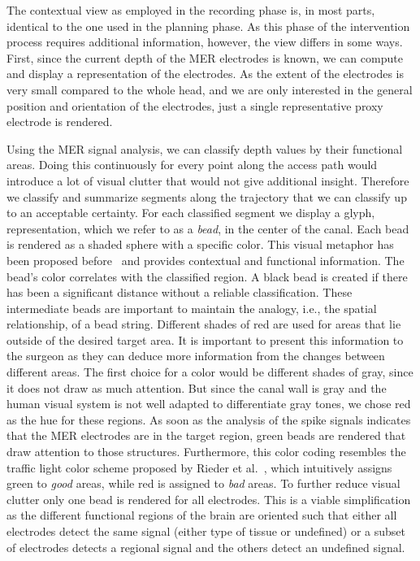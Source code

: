 \documentclass{vgtc}                          %
\begin{document}
The contextual view as employed in the recording phase is, in most parts, identical to the one used in the planning phase. As this phase of the intervention process requires additional information, however, the view differs in some ways. First, since the current depth of the MER electrodes is known, we can compute and display a representation of the electrodes. As the extent of the electrodes is very small compared to the whole head, and we are only interested in the general position and orientation of the electrodes, just a single representative proxy electrode is rendered. 

Using the MER signal analysis, we can classify depth values by their functional areas. Doing this continuously for every point along the access path would introduce a lot of visual clutter that would not give additional insight. Therefore we classify and summarize segments along the trajectory that we can classify up to an acceptable certainty. For each classified segment we display a glyph, representation, which we refer to as a \emph{bead}, in the center of the canal. Each bead is rendered as a shaded sphere with a specific color. This visual metaphor has been proposed before~\cite{Miocinovic2007,Haese2005} and provides contextual and functional information. The bead's color correlates with the classified region. A black bead is created if there has been a significant distance without a reliable classification. These intermediate beads are important to maintain the analogy, i.e., the spatial relationship, of a bead string. Different shades of red are used for areas that lie outside of the desired target area. It is important to present this information to the surgeon as they can deduce more information from the changes between different areas. The first choice for a color would be different shades of gray, since it does not draw as much attention. But since the canal wall is gray and the human visual system is not well adapted to differentiate gray tones, we chose red as the hue for these regions. As soon as the analysis of the spike signals indicates that the MER electrodes are in the target region, green beads are rendered that draw attention to those structures. Furthermore, this color coding resembles the traffic light color scheme proposed by Rieder et al.~\cite{Rieder2010}, which intuitively assigns green to {\it good} areas, while red is assigned to {\it bad} areas. To further reduce visual clutter only one bead is rendered for all electrodes. This is a viable simplification as the different functional regions of the brain are oriented such that either all electrodes detect the same signal (either type of tissue or undefined) or a subset of electrodes detects a regional signal and the others detect an undefined signal.
\end{document}
